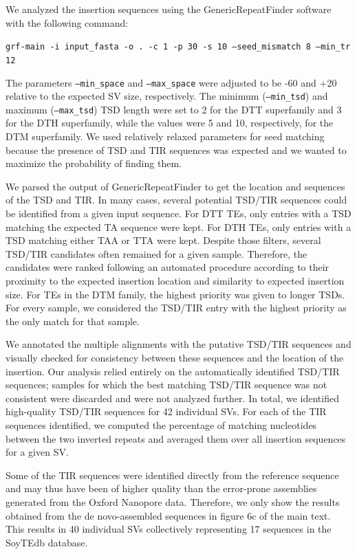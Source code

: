 \documentclass[12pt]{article}
\begin{document}
We analyzed the insertion sequences using the GenericRepeatFinder software \citep{grf} with the following command:

\texttt{grf-main -i input\_fasta -o . -c 1 -p 30 -s 10 --seed\_mismatch 8 --min\_tr 12}

The parameters \texttt{--min\_space} and \texttt{--max\_space} were adjusted to be -60 and +20 relative to the expected SV size, respectively. 
The minimum (\texttt{--min\_tsd}) and maximum (\texttt{--max\_tsd}) TSD length were set to 2 for the DTT superfamily and 3 for the DTH superfamily, while the values were 5 and 10, respectively, for the DTM superfamily. 
We used relatively relaxed parameters for seed matching because the presence of TSD and TIR sequences was expected and we wanted to maximize the probability of finding them.

We parsed the output of GenericRepeatFinder to get the location and sequences of the TSD and TIR.
In many cases, several potential TSD/TIR sequences could be identified from a given input sequence. 
For DTT TEs, only entries with a TSD matching the expected TA sequence were kept. 
For DTH TEs, only entries with a TSD matching either TAA or TTA were kept. 
Despite those filters, several TSD/TIR candidates often remained for a given sample.
Therefore, the candidates were ranked following an automated procedure according to their proximity to the expected insertion location and similarity to expected insertion size.
For TEs in the DTM family, the highest priority was given to longer TSDs.
For every sample, we considered the TSD/TIR entry with the highest priority as the only match for that sample.

We annotated the multiple alignments with the putative TSD/TIR sequences and visually checked for consistency between these sequences and the location of the insertion.
Our analysis relied entirely on the automatically identified TSD/TIR sequences; samples for which the best matching TSD/TIR sequence was not consistent were discarded and were not analyzed further.
In total, we identified high-quality TSD/TIR sequences for 42 individual SVs.
For each of the TIR sequences identified, we computed the percentage of matching nucleotides between the two inverted repeats and averaged them over all insertion sequences for a given SV.

Some of the TIR sequences were identified directly from the reference sequence and may thus have been of higher quality than the error-prone assemblies generated from the Oxford Nanopore data.
Therefore, we only show the results obtained from the de novo-assembled sequences in figure 6c of the main text.
This results in 40 individual SVs collectively representing 17 sequences in the SoyTEdb database.
\end{document}
